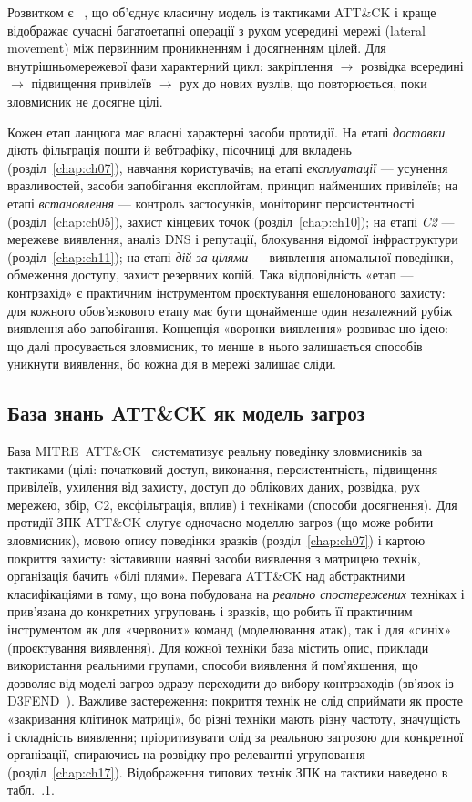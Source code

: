 Розвитком є ~\cite{ch04:pols}, що об'єднує класичну модель із тактиками ATT\&CK і краще відображає сучасні багатоетапні операції з рухом усередині мережі (lateral movement) між первинним проникненням і досягненням цілей. Для внутрішньомережевої фази характерний цикл: закріплення $\to$ розвідка всередині $\to$ підвищення привілеїв $\to$ рух до нових вузлів, що повторюється, поки зловмисник не досягне цілі.

Кожен етап ланцюга має власні характерні засоби протидії. На етапі \emph{доставки} діють фільтрація пошти й вебтрафіку, пісочниці для вкладень (розділ~\ref{chap:ch07}), навчання користувачів; на етапі \emph{експлуатації} --- усунення вразливостей, засоби запобігання експлойтам, принцип найменших привілеїв; на етапі \emph{встановлення} --- контроль застосунків, моніторинг персистентності (розділ~\ref{chap:ch05}), захист кінцевих точок (розділ~\ref{chap:ch10}); на етапі \emph{C2} --- мережеве виявлення, аналіз DNS і репутації, блокування відомої інфраструктури (розділ~\ref{chap:ch11}); на етапі \emph{дій за цілями} --- виявлення аномальної поведінки, обмеження доступу, захист резервних копій. Така відповідність «етап --- контрзахід» є практичним інструментом проєктування ешелонованого захисту: для кожного обов'язкового етапу має бути щонайменше один незалежний рубіж виявлення або запобігання. Концепція «воронки виявлення» розвиває цю ідею: що далі просувається зловмисник, то менше в нього залишається способів уникнути виявлення, бо кожна дія в мережі залишає сліди.

\subsection{База знань ATT\&CK як модель загроз}

База MITRE~ATT\&CK~\cite{mitre-attack,ch04:strom} систематизує реальну поведінку зловмисників за тактиками (цілі: початковий доступ, виконання, персистентність, підвищення привілеїв, ухилення від захисту, доступ до облікових даних, розвідка, рух мережею, збір, C2, ексфільтрація, вплив) і техніками (способи досягнення). Для протидії ЗПК ATT\&CK слугує одночасно моделлю загроз (що може робити зловмисник), мовою опису поведінки зразків (розділ~\ref{chap:ch07}) і картою покриття захисту: зіставивши наявні засоби виявлення з матрицею технік, організація бачить «білі плями». Перевага ATT\&CK над абстрактними класифікаціями в тому, що вона побудована на \emph{реально спостережених} техніках і прив'язана до конкретних угруповань і зразків, що робить її практичним інструментом як для «червоних» команд (моделювання атак), так і для «синіх» (проєктування виявлення). Для кожної техніки база містить опис, приклади використання реальними групами, способи виявлення й пом'якшення, що дозволяє від моделі загроз одразу переходити до вибору контрзаходів (зв'язок із D3FEND~\cite{mitre-defend}). Важливе застереження: покриття технік не слід сприймати як просте «закривання клітинок матриці», бо різні техніки мають різну частоту, значущість і складність виявлення; пріоритизувати слід за реальною загрозою для конкретної організації, спираючись на розвідку про релевантні угруповання (розділ~\ref{chap:ch17}). Відображення типових технік ЗПК на тактики наведено в табл.~\thechapter.1.

